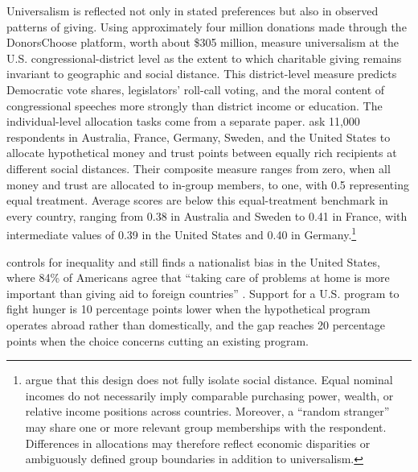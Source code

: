 \documentclass[11pt,a4paper]{article}
\begin{document}
Universalism is reflected not only in stated preferences but also in observed patterns of giving. Using approximately four million donations made through the DonorsChoose platform, worth about \$305 million, \citet{enke_universalism_2024} measure universalism at the U.S. congressional-district level as the extent to which charitable giving remains invariant to geographic and social distance. This district-level measure predicts Democratic vote shares, legislators' roll-call voting, and the moral content of congressional speeches more strongly than district income or education. The individual-level allocation tasks come from a separate paper. \citet{enke_moral_2023} ask 11,000 respondents in Australia, France, Germany, Sweden, and the United States to allocate hypothetical money and trust points between equally rich recipients at different social distances. Their composite measure ranges from zero, when all money and trust are allocated to in-group members, to one, with 0.5 representing equal treatment. Average scores are below this equal-treatment benchmark in every country, ranging from 0.38 in Australia and Sweden to 0.41 in France, with intermediate values of 0.39 in the United States and 0.40 in Germany.\footnote{\citet{boyer-kassem_how_2026} argue that this design does not fully isolate social distance. Equal nominal incomes do not necessarily imply comparable purchasing power, wealth, or relative income positions across countries. Moreover, a ``random stranger'' may share one or more relevant group memberships with the respondent. Differences in allocations may therefore reflect economic disparities or ambiguously defined group boundaries in addition to universalism.}

\citet{prather_2013} controls for inequality and still finds a nationalist bias in the United States, where 84\% of Americans agree that ``taking care of problems at home is more important than giving aid to foreign countries'' \citep{PIPA2001}. Support for a U.S. program to fight hunger is 10 percentage points lower when the hypothetical program operates abroad rather than domestically, and the gap reaches 20 percentage points when the choice concerns cutting an existing program.
\end{document}
